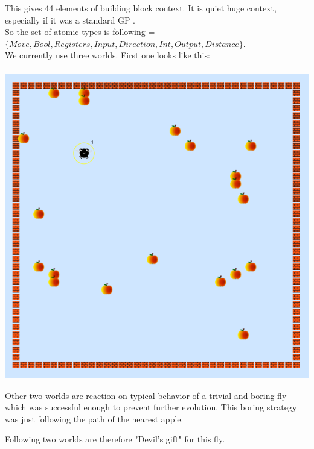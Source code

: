 \documentclass[12pt,a4paper]{report}
\begin{document}
This gives 44 elements of building block context. It is quiet huge 
context, especially if it was a standard GP \TuF.\\

So the set of atomic types is following =\\
$\{Move, Bool, Registers, Input,
Direction, Int, Output, Distance\}$.\\


We currently use three worlds.
First one looks like this:\\

~\\[2em]

\includegraphics[scale=0.8]{fly/1.png}


Other two worlds are reaction on typical behavior 
of a trivial and boring fly which was successful
enough to prevent further evolution.
This boring strategy was just following the path 
of the nearest apple. 

\newpage

Following two worlds are therefore "Devil's gift" for this fly.\\
\end{document}
